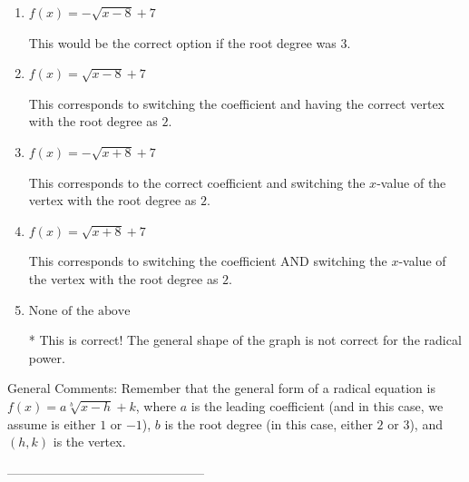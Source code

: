 \documentclass{article}[14pt]
\begin{document}
\begin{enumerate}[label=\Alph*.] 
\item $ f(x) = - \sqrt{x - 8} + 7 $ 

 This would be the correct option if the root degree was $3$. 
\item $ f(x) = \sqrt{x - 8} + 7 $ 

 This corresponds to switching the coefficient and having the correct vertex with the root degree as $2$. 
\item $ f(x) = - \sqrt{x + 8} + 7 $ 

 This corresponds to the correct coefficient and switching the $x$-value of the vertex with the root degree as $2$. 
\item $ f(x) = \sqrt{x + 8} + 7 $ 

 This corresponds to switching the coefficient AND switching the $x$-value of the vertex with the root degree as $2$. 
\item $ \text{None of the above} $ 

 * This is correct! The general shape of the graph is not correct for the radical power. 
\end{enumerate} 
 
General Comments: Remember that the general form of a radical equation is $ f(x) = a \sqrt[b]{x - h} + k$, where $a$ is the leading coefficient (and in this case, we assume is either $1$ or $-1$), $b$ is the root degree (in this case, either $2$ or $3$), and $(h, k)$ is the vertex.

-----------------------------------------------
\end{document}
